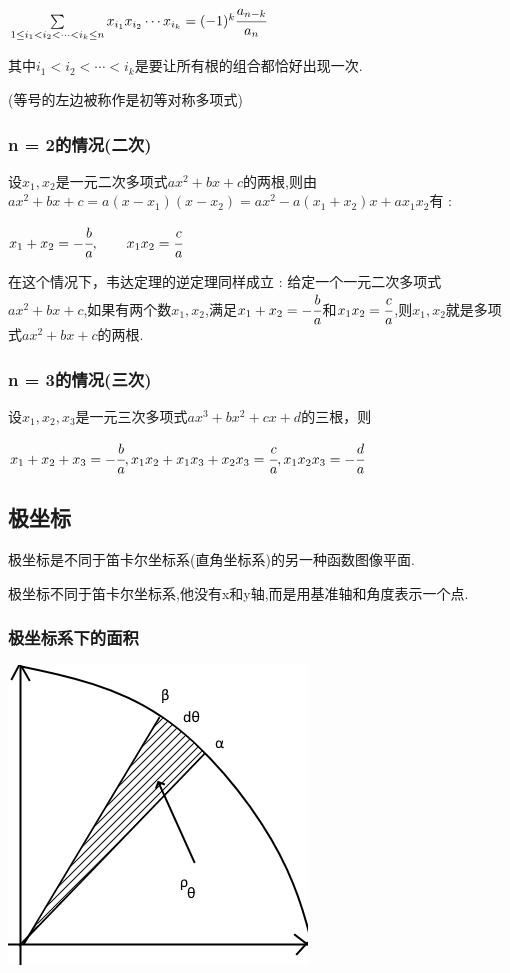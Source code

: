 {{{$\sum\limits_{1 \leq i_1 < i_2 < \dotsm < i_k \leq n}x_{i_{1}}x_{i_{2}} \dotsm x_{i_{k}} = (-1)^k\cfrac{a_{n-k}}{a_n}$

其中$i_1 < i_2 < \dotsm < i_k$是要让所有根的组合都恰好出现一次.

(等号的左边被称作是初等对称多项式)
}%

\subsubsection{n = 2的情况(二次)}{
    设$x_1,x_2$是一元二次多项式$ax^2 + bx + c$的两根,则由$ax^2 +bx + c = a(x - x_1)(x - x_2) = ax^2 - a(x_1 + x_2)x + ax_1x_2$有 :

    $x_1 + x_2 = -\cfrac{b}{a},\qquad x_1x_2 = \cfrac{c}{a}$

    在这个情况下，韦达定理的逆定理同样成立 : 给定一个一元二次多项式$ax^2 + bx + c$,如果有两个数$x_1,x_2$,满足$x_1 + x_2 = -\cfrac{b}{a}$和$x_1x_2 = \cfrac{c}{a}$,则$x_1,x_2$就是多项式$ax^2 + bx + c$的两根.
}%

\subsubsection{n = 3的情况(三次)}{
    设$x_1,x_2,x_3$是一元三次多项式$ax^3 + bx^2 + cx + d$的三根，则

    $x_1 + x_2 + x_3 = -\cfrac{b}{a}, x_1x_2 + x_1x_3 + x_2x_3 = \cfrac{c}{a},x_1x_2x_3 = -\cfrac{d}{a}$
}%

}%

\subsection{极坐标}{
极坐标是不同于笛卡尔坐标系(直角坐标系)的另一种函数图像平面.

极坐标不同于笛卡尔坐标系,他没有x和y轴,而是用基准轴和角度表示一个点.

\subsubsection{极坐标系下的面积}{
    \begin{center}
        \includegraphics{resources/polar_coordness.png}
    \end{center}

}}}
